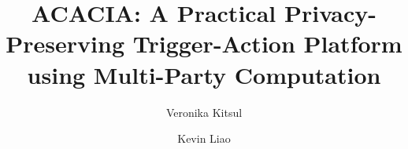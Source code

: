 \documentclass[sigplan,10pt]{acmart}
\begin{document}
\sloppy

\title{ACACIA: A Practical Privacy-Preserving Trigger-Action Platform using Multi-Party Computation}
\author{Veronika Kitsul}
\author{Kevin Liao}



\maketitle






















\end{document}

